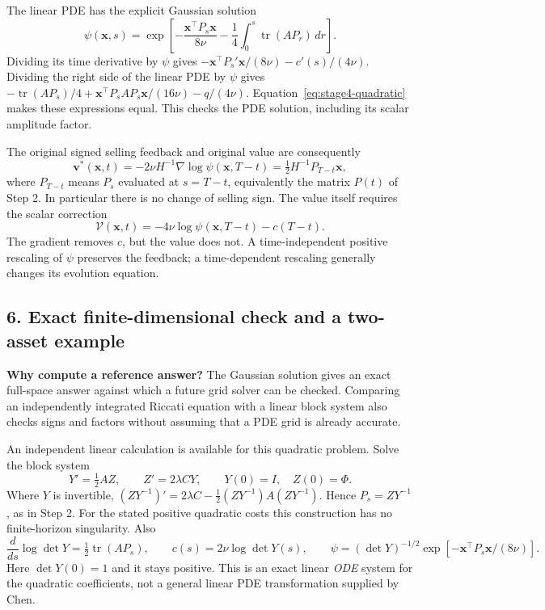 \documentclass[11pt,a4paper]{article}
\begin{document}
The linear PDE has the explicit Gaussian solution
\begin{equation}
 \psi(\mathbf x,s)=\exp\left[-\frac{\mathbf x^\top P_s\mathbf x}{8\nu}
 -\frac14\int_0^s\operatorname{tr}(AP_r)\,dr\right].
 \label{eq:stage4-gaussian}
\end{equation}
Dividing its time derivative by $\psi$ gives
$-\mathbf x^\top P_s'\mathbf x/(8\nu)-c'(s)/(4\nu)$.
Dividing the right side of the linear PDE by $\psi$ gives
$-\operatorname{tr}(AP_s)/4+
\mathbf x^\top P_sAP_s\mathbf x/(16\nu)-q/(4\nu)$.
Equation~\eqref{eq:stage4-quadratic} makes these expressions equal.
This checks the PDE solution, including its scalar amplitude factor.

The original signed selling feedback and original value are consequently
\begin{equation}
 \boxed{\mathbf v^*(\mathbf x,t)
 =-2\nu H^{-1}\nabla\log\psi(\mathbf x,T-t)
 =\tfrac12H^{-1}P_{T-t}\mathbf x,}
 \label{eq:recovery}
\end{equation}
where $P_{T-t}$ means $P_s$ evaluated at $s=T-t$, equivalently
the matrix $P(t)$ of Step 2. In particular there is no change of selling
sign. The value itself requires the scalar correction
\begin{equation}
 \boxed{\mathcal V(\mathbf x,t)
 =-4\nu\log\psi(\mathbf x,T-t)-c(T-t).}
 \label{eq:stage4-value-recovery}
\end{equation}
The gradient removes $c$, but the value does not. A time-independent
positive rescaling of $\psi$ preserves the feedback; a time-dependent
rescaling generally changes its evolution equation.

\subsection*{6. Exact finite-dimensional check and a two-asset example}

\textbf{Why compute a reference answer?} The Gaussian solution gives an
exact full-space answer against which a future grid solver can be checked.
Comparing an independently integrated Riccati equation with a linear block
system also checks signs and factors without assuming that a PDE grid is
already accurate.

An independent linear calculation is available for this quadratic
problem. Solve the block system
\begin{equation}
 Y'=\tfrac12AZ,\qquad Z'=2\lambda CY,\qquad
 Y(0)=I,\quad Z(0)=\Phi.
 \label{eq:stage4-block}
\end{equation}
Where $Y$ is invertible,
$(ZY^{-1})'=2\lambda C-\tfrac12(ZY^{-1})A(ZY^{-1})$.
Hence $P_s=ZY^{-1}$, as in Step 2. For the stated positive quadratic
costs this construction has no finite-horizon singularity. Also
\[
 \frac{d}{ds}\log\det Y=\tfrac12\operatorname{tr}(AP_s),\qquad
 c(s)=2\nu\log\det Y(s),\qquad
 \psi=(\det Y)^{-1/2}
       \exp[-\mathbf x^\top P_s\mathbf x/(8\nu)].
\]
Here $\det Y(0)=1$ and it stays positive. This is an exact linear
\emph{ODE} system for the quadratic coefficients, not a general linear
PDE transformation supplied by Chen.
\end{document}
